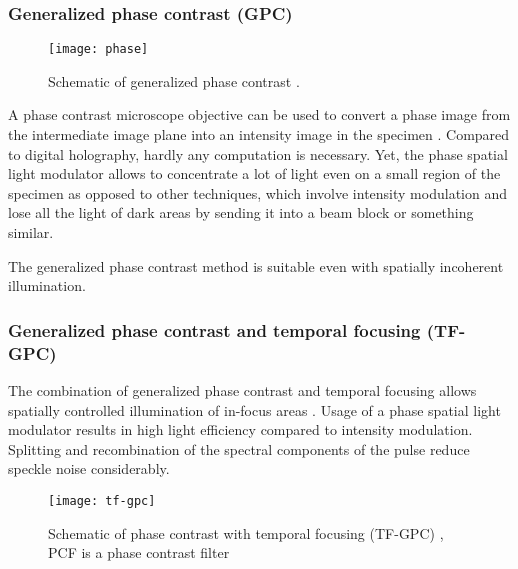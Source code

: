 \subsubsection{Generalized phase contrast (GPC)}
\begin{figure}[!hbt]
  \centering
  \texttt{[image: phase]} %
  \caption{Schematic of generalized phase contrast
    \citep[from][]{Rodrigo2008}.}
  \label{fig:phase}
\end{figure}
A phase contrast microscope objective  can be used to
convert a phase image from the intermediate image plane into an
intensity image in the specimen \citep{Rodrigo2008}. Compared to digital holography, hardly any computation is
necessary. Yet, the phase spatial light modulator allows to
concentrate a lot of light even on a small region of the specimen as
opposed to other techniques, which involve intensity modulation and
lose all the light of dark areas by sending it into a beam block or
something similar.

The generalized phase contrast method is suitable even with spatially
incoherent illumination.
\subsubsection{Generalized phase contrast and temporal focusing (TF-GPC)}
The combination of generalized phase contrast and temporal focusing
allows spatially controlled illumination of in-focus areas
\citep{Papagiakoumou2010}. Usage of a phase spatial light modulator
results in high light efficiency compared to intensity modulation.
Splitting and recombination of the spectral components of the pulse
reduce speckle noise considerably.
\begin{figure}[!hbt]
  \centering
  \texttt{[image: tf-gpc]} 
  \caption{Schematic of phase contrast with temporal focusing (TF-GPC)
    \citep[from][]{papagiakoumou2010}, PCF is a phase contrast filter}
  \label{fig:tf-gpc}
\end{figure}

